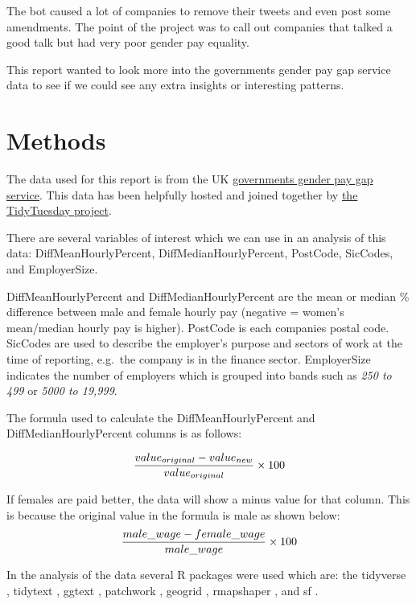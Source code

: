 \documentclass[
  11pt,
  letterpaper,
  DIV=11,
  numbers=noendperiod]{scrartcl}
\begin{document}
The bot caused a lot of companies to remove their tweets and even post
some amendments. The point of the project was to call out companies that
talked a good talk but had very poor gender pay equality.

This report wanted to look more into the governments gender pay gap
service data to see if we could see any extra insights or interesting
patterns.

\newpage

\section{Methods}\label{methods}

The data used for this report is from the UK
\href{https://gender-pay-gap.service.gov.uk/}{governments gender pay gap
service}. This data has been helpfully hosted and joined together by
\href{https://github.com/rfordatascience/tidytuesday/tree/master/data/2022/2022-06-28}{the
TidyTuesday project}.

There are several variables of interest which we can use in an analysis
of this data: DiffMeanHourlyPercent, DiffMedianHourlyPercent, PostCode,
SicCodes, and EmployerSize.

DiffMeanHourlyPercent and DiffMedianHourlyPercent are the mean or median
\% difference between male and female hourly pay (negative = women's
mean/median hourly pay is higher). PostCode is each companies postal
code. SicCodes are used to describe the employer's purpose and sectors
of work at the time of reporting, e.g.~the company is in the finance
sector. EmployerSize indicates the number of employers which is grouped
into bands such as \emph{250 to 499} or \emph{5000 to 19,999}.

The formula used to calculate the DiffMeanHourlyPercent and
DiffMedianHourlyPercent columns is as follows:

\[ {{value_{original} - value_{new}} \over {value_{original}}} \times 100 \]

If females are paid better, the data will show a minus value for that
column. This is because the original value in the formula is male as
shown below:
\[ {{male\_wage - female\_wage \over male\_wage}} \times 100 \]

In the analysis of the data several R packages were used which are: the
tidyverse \citep{tidyverse}, tidytext \citep{tidytext}, ggtext
\citep{ggtext}, patchwork \citep{patchwork}, geogrid \citep{geogrid},
rmapshaper \citep{rmapshaper}, and sf \citep{sf}.
\end{document}
